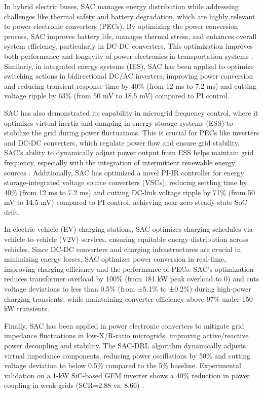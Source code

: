 In hybrid electric buses, SAC manages energy distribution while addressing challenges like thermal safety and battery degradation, which are highly relevant to power electronic converters (PECs). By optimizing the power conversion process, SAC improves battery life, manages thermal stress, and enhances overall system efficiency, particularly in DC-DC converters. This optimization improves both performance and longevity of power electronics in transportation systems \cite{wu2020battery}. Similarly, in integrated energy systems (IES), SAC has been applied to optimize switching actions in bidirectional DC/AC inverters, improving power conversion and reducing transient response time by 40\% (from 12 ms to 7.2 ms) and cutting voltage ripple by 63\% (from 50 mV to 18.5 mV) compared to PI control.

SAC has also demonstrated its capability in microgrid frequency control, where it optimizes virtual inertia and damping in energy storage systems (ESS) to stabilize the grid during power fluctuations. This is crucial for PECs like inverters and DC-DC converters, which regulate power flow and ensure grid stability. SAC’s ability to dynamically adjust power output from ESS helps maintain grid frequency, especially with the integration of intermittent renewable energy sources \cite{li2021mechanism}. Additionally, SAC has optimized a novel PI-IR controller for energy storage-integrated voltage source converters (VSCs), reducing settling time by 40\% (from 12 ms to 7.2 ms) and cutting DC-link voltage ripple by 71\% (from 50 mV to 14.5 mV) compared to PI control, achieving near-zero steady-state SoC drift.

In electric vehicle (EV) charging stations, SAC optimizes charging schedules via vehicle-to-vehicle (V2V) services, ensuring equitable energy distribution across vehicles. Since DC-DC converters and charging infrastructures are crucial in minimizing energy losses, SAC optimizes power conversion in real-time, improving charging efficiency and the performance of PECs. SAC’s optimization reduces transformer overload by 100\% (from 181 kW peak overload to 0) and cuts voltage deviations to less than 0.5\% (from ±5.1\% to ±0.2\%) during high-power charging transients, while maintaining converter efficiency above 97\% under 150-kW transients.

Finally, SAC has been applied in power electronic converters to mitigate grid impedance fluctuations in low-X/R-ratio microgrids, improving active/reactive power decoupling and stability. The SAC-DRL algorithm dynamically adjusts virtual impedance components, reducing power oscillations by 50\% and cutting voltage deviation to below 0.5\% compared to the 5\% baseline. Experimental validation on a 1-kW SiC-based GFM inverter shows a 40\% reduction in power coupling in weak grids (SCR=2.88 vs. 8.66) \cite{oshnoei2024grid}.

